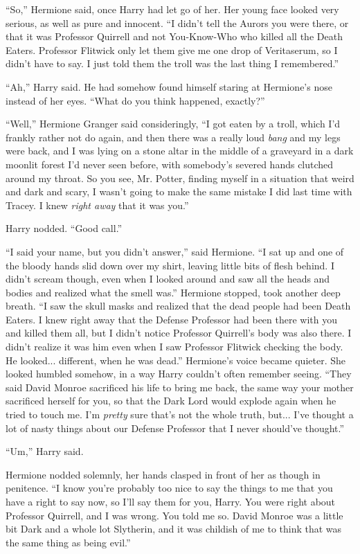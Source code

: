 ``So,'' Hermione said, once Harry had let go of her. Her young face looked very serious, as well as pure and innocent. ``I didn't tell the Aurors you were there, or that it was Professor Quirrell and not You-Know-Who who killed all the Death Eaters. Professor Flitwick only let them give me one drop of Veritaserum, so I didn't have to say. I just told them the troll was the last thing I remembered.''

``Ah,'' Harry said. He had somehow found himself staring at Hermione's nose instead of her eyes. ``What do you think happened, exactly?''

``Well,'' Hermione Granger said consideringly, ``I got eaten by a troll, which I'd frankly rather not do again, and then there was a really loud \emph{bang} and my legs were back, and I was lying on a stone altar in the middle of a graveyard in a dark moonlit forest I'd never seen before, with somebody's severed hands clutched around my throat. So you see, Mr. Potter, finding myself in a situation that weird and dark and scary, I wasn't going to make the same mistake I did last time with Tracey. I knew \emph{right away} that it was you.''

Harry nodded. ``Good call.''

``I said your name, but you didn't answer,'' said Hermione. ``I sat up and one of the bloody hands slid down over my shirt, leaving little bits of flesh behind. I didn't scream though, even when I looked around and saw all the heads and bodies and realized what the smell was.'' Hermione stopped, took another deep breath. ``I saw the skull masks and realized that the dead people had been Death Eaters. I knew right away that the Defense Professor had been there with you and killed them all, but I didn't notice Professor Quirrell's body was also there. I didn't realize it was him even when I saw Professor Flitwick checking the body. He looked... different, when he was dead.'' Hermione's voice became quieter. She looked humbled somehow, in a way Harry couldn't often remember seeing. ``They said David Monroe sacrificed his life to bring me back, the same way your mother sacrificed herself for you, so that the Dark Lord would explode again when he tried to touch me. I'm \emph{pretty} sure that's not the whole truth, but... I've thought a lot of nasty things about our Defense Professor that I never should've thought.''

``Um,'' Harry said.

Hermione nodded solemnly, her hands clasped in front of her as though in penitence. ``I know you're probably too nice to say the things to me that you have a right to say now, so I'll say them for you, Harry. You were right about Professor Quirrell, and I was wrong. You told me so. David Monroe was a little bit Dark and a whole lot Slytherin, and it was childish of me to think that was the same thing as being evil.''

